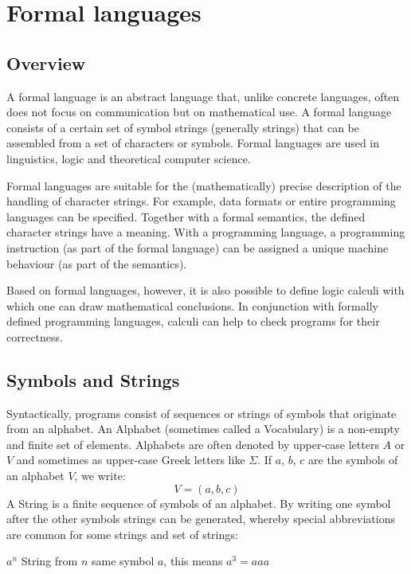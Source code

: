 \chapter{Formal languages}
\section{Overview}
A formal language is an abstract language that, unlike concrete languages, often does not focus on communication but on mathematical use. A formal language consists of a certain set of symbol strings (generally strings) that can be assembled from a set of characters or symbols. Formal languages are used in linguistics, logic and theoretical computer science.

Formal languages are suitable for the (mathematically) precise description of the handling of character strings. For example, data formats or entire programming languages can be specified. Together with a formal semantics, the defined character strings have a meaning. With a programming language, a programming instruction (as part of the formal language) can be assigned a unique machine behaviour (as part of the semantics).

Based on formal languages, however, it is also possible to define logic calculi with which one can draw mathematical conclusions. In conjunction with formally defined programming languages, calculi can help to check programs for their correctness.
\section{Symbols and Strings}
Syntactically, programs consist of sequences or strings of symbols that originate from an alphabet. An Alphabet (sometimes called a Vocabulary) is a non-empty and finite set of elements. Alphabets are often denoted by upper-case letters $A$ or $V$ and sometimes as upper-case Greek letters like $\Sigma$.
If $a$, $b$, $c$ are the symbols of an alphabet $V$, we write:
$$V=(a,b,c)$$
A String is a finite sequence of symbols of an alphabet. By writing one symbol after the other symbols strings can be generated, whereby special abbreviations are common for some strings and set of strings:

$a^n$ \qquad\qquad String from $n$ same symbol $a$, this means $a^3=aaa$


